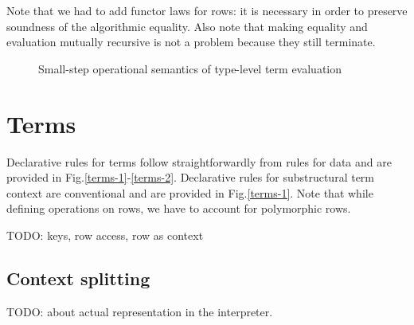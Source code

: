 \documentclass[a4paper,14pt]{extreport}
\begin{document}
Note that we had to add functor laws for rows: it is necessary in order to
preserve soundness of the algorithmic equality. Also note that making equality
and evaluation mutually recursive is not a problem because they still terminate.

\begin{figure}[h!]
    \centering
    \caption{Small-step operational semantics of type-level term evaluation}
    \label{eval}
\end{figure}

\section{Terms}

Declarative rules for terms follow straightforwardly from rules for data and are
provided in Fig.\ref{terms-1}-\ref{terms-2}. Declarative rules for substructural
term context are conventional and are provided in Fig.\ref{terms-1}. Note that
while defining operations on rows, we have to account for polymorphic rows.

TODO: keys, row access, row as context

\subsection{Context splitting}

TODO: about actual representation in the interpreter.
\end{document}
